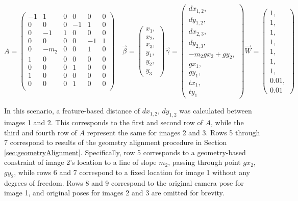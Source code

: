 \documentclass[]{spie}  %
\begin{document}
\[
A =
\begin{pmatrix}
  -1 & 1 & 0 & 0 & 0 & 0\\
  0 & 0 & 0 & -1 & 1 & 0\\
  0 & -1 & 1 & 0 & 0 & 0\\
  0 & 0 & 0 & 0 & -1 & 1\\
  0 & -m_2 & 0 & 0 & 1 & 0\\
  1 & 0 & 0 & 0 & 0 & 0\\
  0 & 0 & 0 & 1 & 0 & 0\\
  1 & 0 & 0 & 0 & 0 & 0\\
  0 & 0 & 0 & 1 & 0 & 0\\

\end{pmatrix}\quad
\vec{\beta} =
\begin{pmatrix}
  x_1, \\ x_2, \\ x_3, \\ y_1, \\ y_2, \\ y_3
\end{pmatrix}
\vec{\gamma} =
\begin{pmatrix}
  dx_{1,2}, \\ dy_{1,2}, \\ dx_{2,3}, \\ dy_{2,3}, \\ -m_2gx_2 + gy_2,
  \\ gx_1, \\ gy_1, \\ tx_1, \\ ty_1
  
\end{pmatrix}
\vec{W} =
\begin{pmatrix}
  1, \\ 1, \\ 1, \\ 1, \\ 1, \\ 1, \\ 1, \\ 0.01, \\ 0.01
\end{pmatrix}
\]


In this scenario, a feature-based distance of $dx_{1,2}$, $dy_{1,2}$
was calculated between images 1 and 2. This corresponds to the first
and second row of $A$, while the third and fourth row of $A$ represent
the same for images 2 and 3. Rows 5 through 7 correspond to results of
the geometry alignment procedure in Section
\ref{sec:geometryAlignment}. Specifically, row 5 corresponds to a
geometry-based constraint of image 2's location to a line of slope
$m_2$, passing through point $gx_2$, $gy_2$, while rows 6 and 7
correspond to a fixed location for image 1 without any degrees of
freedom. Rows 8 and 9 correspond to the original camera pose for image
1, and original poses for images 2 and 3 are omitted for brevity.
\end{document}
